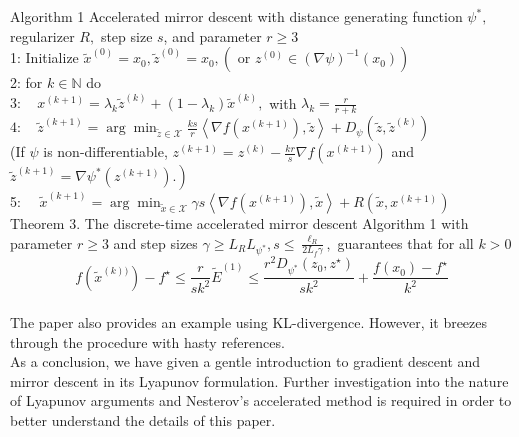\documentclass{article}
\begin{document}
Algorithm 1 Accelerated mirror descent with distance generating function $\psi^{*},$ regularizer $R,$ step size $s$, and parameter $r \geq 3$\\
1: Initialize $\tilde{x}^{(0)}=x_{0}, \tilde{z}^{(0)}=x_{0},\left(\right.$ or $\left.z^{(0)} \in(\nabla \psi)^{-1}\left(x_{0}\right)\right)$\\
2: for $k \in \mathbb{N}$ do\\
$3: \quad x^{(k+1)}=\lambda_{k} \tilde{z}^{(k)}+\left(1-\lambda_{k}\right) \tilde{x}^{(k)},$ with $\lambda_{k}=\frac{r}{r+k}$\\
$4: \quad \tilde{z}^{(k+1)}=\arg \min _{\tilde{z} \in \mathcal{X}} \frac{k s}{r}\left\langle\nabla f\left(x^{(k+1)}\right), \tilde{z}\right\rangle+D_{\psi}\left(\tilde{z}, \tilde{z}^{(k)}\right)$\\
(If $\psi$ is non-differentiable, $z^{(k+1)}=z^{(k)}-\frac{k r}{s} \nabla f\left(x^{(k+1)}\right)$ and $\left.\tilde{z}^{(k+1)}=\nabla \psi^{*}\left(z^{(k+1)}\right) .\right)$\\
5: $\quad \tilde{x}^{(k+1)}=\arg \min _{\tilde{x} \in \mathcal{X}} \gamma s\left\langle\nabla f\left(x^{(k+1)}\right), \tilde{x}\right\rangle+R\left(\tilde{x}, x^{(k+1)}\right)$\\

Theorem 3. The discrete-time accelerated mirror descent Algorithm 1 with parameter $r \geq 3$ and step sizes $\gamma \geq L_{R} L_{\psi^{*}}, s \leq \frac{\ell_{R}}{2 L_{f} \gamma},$ guarantees that for all $k>0$
$$
f\left(\tilde{x}^{(k))}\right)-f^{\star} \leq \frac{r}{s k^{2}} \tilde{E}^{(1)} \leq \frac{r^{2} D_{\psi^{*}}\left(z_{0}, z^{\star}\right)}{s k^{2}}+\frac{f\left(x_{0}\right)-f^{\star}}{k^{2}}
$$\\

The paper also provides an example using KL-divergence. However, it breezes through the procedure with hasty references.\\

As a conclusion, we have given a gentle introduction to gradient descent and mirror descent in its Lyapunov formulation. Further investigation into the nature of Lyapunov arguments and Nesterov's accelerated method is required in order to better understand the details of this paper.



\end{document}

